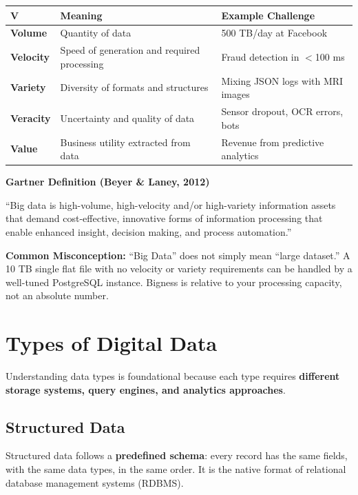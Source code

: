 \documentclass[12pt,a4paper]{article}
\newcommand{\defbox}[2]{%
  \noindent
  \colorbox{PUNavy!12}{%
    \begin{minipage}{\dimexpr\linewidth-2\fboxsep}
      \vspace{4pt}
      \textbf{\textcolor{PUNavy}{#1}}\par\vspace{2pt}
      #2
      \vspace{4pt}
    \end{minipage}%
  }\par\vspace{6pt}%
}
\newcommand{\cautionbox}[1]{%
  \noindent
  \colorbox{PURed!10}{%
    \begin{minipage}{\dimexpr\linewidth-2\fboxsep}
      \vspace{4pt}
      \textcolor{PURed}{\textbf{Common Misconception:}} \; #1
      \vspace{4pt}
    \end{minipage}%
  }\par\vspace{6pt}%
}
\begin{document}
\begin{center}
\renewcommand{\arraystretch}{1.4}
\begin{tabular}{p{2.4cm}p{6.0cm}p{4.2cm}}
  \toprule
  \textbf{V} & \textbf{Meaning} & \textbf{Example Challenge} \\
  \midrule
  \textbf{Volume}   & Quantity of data & 500 TB/day at Facebook \\
  \textbf{Velocity} & Speed of generation and required processing & Fraud detection in $<$100 ms \\
  \textbf{Variety}  & Diversity of formats and structures & Mixing JSON logs with MRI images \\
  \textbf{Veracity} & Uncertainty and quality of data & Sensor dropout, OCR errors, bots \\
  \textbf{Value}    & Business utility extracted from data & Revenue from predictive analytics \\
  \bottomrule
\end{tabular}
\end{center}

\defbox{Gartner Definition (Beyer \& Laney, 2012)}{``Big data is high-volume, high-velocity and/or high-variety information assets that demand cost-effective, innovative forms of information processing that enable enhanced insight, decision making, and process automation.''}

\cautionbox{``Big Data'' does not simply mean ``large dataset.'' A 10 TB single flat file with no velocity or variety requirements can be handled by a well-tuned PostgreSQL instance. Bigness is relative to your processing capacity, not an absolute number.}

\section{Types of Digital Data}

Understanding data types is foundational because each type requires \textbf{different storage systems, query engines, and analytics approaches}.

\subsection{Structured Data}

Structured data follows a \textbf{predefined schema}: every record has the same fields, with the same data types, in the same order. It is the native format of relational database management systems (RDBMS).
\end{document}
